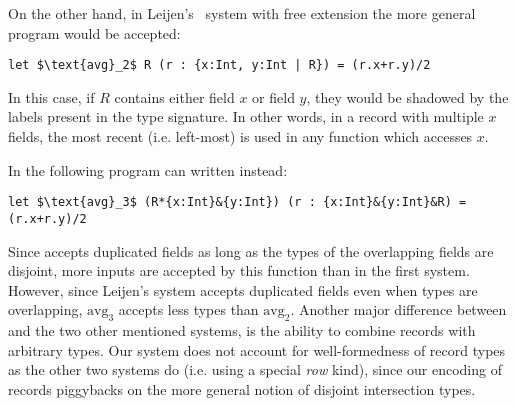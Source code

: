 On the other hand, in Leijen's~\cite{leijen2005extensible} system with free extension 
the more general program would be accepted:
\begin{lstlisting}[mathescape=true]
let $\text{avg}_2$ R (r : {x:Int, y:Int | R}) = (r.x+r.y)/2 
\end{lstlisting}
In this case, if $R$ contains either field $x$ or field $y$, they would be shadowed by the labels 
present in the type signature.
In other words, in a record with multiple $x$ fields, the most recent (i.e. left-most) is used 
in any function which accesses $x$.

In \name the following program can written instead:
\begin{lstlisting}[mathescape=true]
let $\text{avg}_3$ (R*{x:Int}&{y:Int}) (r : {x:Int}&{y:Int}&R) = (r.x+r.y)/2 
\end{lstlisting}
Since \name accepts duplicated fields as long as the types of the
overlapping fields are disjoint, more inputs are accepted by this
function than in the first system. However, since Leijen's system
accepts duplicated fields even when types are overlapping, $\text{avg}_3$
accepts less types than $\text{avg}_2$. 
Another major difference between \name and the two other mentioned systems, is the ability to 
combine records with arbitrary types.
Our system does not account for well-formedness of record types as the other two systems do 
(i.e. using a special \emph{row} kind), since our encoding of records piggybacks on the more
general notion of disjoint intersection types. 

